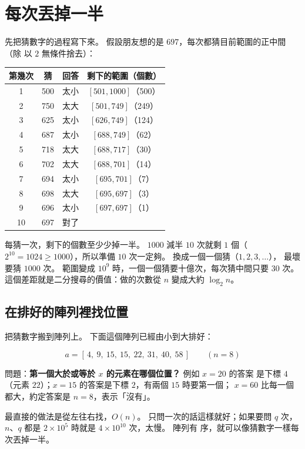 \section{每次丟掉一半}
\label{sec:bs-halving}

先把猜數字的過程寫下來。 假設朋友想的是 $697$，每次都猜目前範圍的正中間（除
以 $2$ 無條件捨去）：

\begin{center}
\begin{tabular}{cccc}
\toprule
第幾次 & 猜 & 回答 & 剩下的範圍（個數） \\
\midrule
1 & 500 & 太小 & $[501, 1000]$（500） \\
2 & 750 & 太大 & $[501, 749]$（249） \\
3 & 625 & 太小 & $[626, 749]$（124） \\
4 & 687 & 太小 & $[688, 749]$（62） \\
5 & 718 & 太大 & $[688, 717]$（30） \\
6 & 702 & 太大 & $[688, 701]$（14） \\
7 & 694 & 太小 & $[695, 701]$（7） \\
8 & 698 & 太大 & $[695, 697]$（3） \\
9 & 696 & 太小 & $[697, 697]$（1） \\
10 & 697 & 對了 & \\
\bottomrule
\end{tabular}
\end{center}

每猜一次，剩下的個數至少少掉一半。 $1000$ 減半 $10$ 次就剩 $1$ 個（$2^{10} =
1024 \ge 1000$），所以準備 $10$ 次一定夠。 換成一個一個猜（$1, 2, 3, \ldots$），
最壞要猜 $1000$ 次。 範圍變成 $10^9$ 時，一個一個猜要十億次，每次猜中間只要
$30$ 次。 這個差距就是二分搜尋的價值：做的次數從 $n$ 變成大約 $\log_2 n$。

\subsection{在排好的陣列裡找位置}
\label{sec:bs-template}

把猜數字搬到陣列上。 下面這個陣列已經由小到大排好：

\[
a = [\,4,\ 9,\ 15,\ 15,\ 22,\ 31,\ 40,\ 58\,] \qquad (n = 8)
\]

問題：\textbf{第一個大於或等於 $x$ 的元素在哪個位置？} 例如 $x = 20$ 的答案
是下標 $4$（元素 $22$）；$x = 15$ 的答案是下標 $2$，有兩個 $15$ 時要第一個；
$x = 60$ 比每一個都大，約定答案是 $n = 8$，表示「沒有」。

最直接的做法是從左往右找，$O(n)$。 只問一次的話這樣就好；如果要問 $q$ 次，
$n$、$q$ 都是 $2 \times 10^5$ 時就是 $4 \times 10^{10}$ 次，太慢。 陣列有
序，就可以像猜數字一樣每次丟掉一半。

